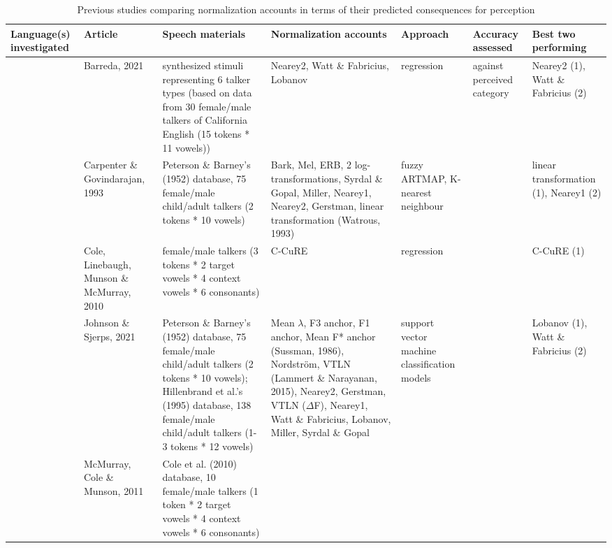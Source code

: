 \documentclass[utf8]{frontiersSCNS}
\begin{document}
\begin{landscape}\begin{table}

\caption{\label{tab:norm-evaluation-percep}Previous studies comparing normalization accounts in terms of their predicted consequences for perception}
\centering
\fontsize{7}{9}\selectfont
\begin{tabular}[t]{>{\raggedright\arraybackslash}p{2cm}>{\raggedright\arraybackslash}p{2cm}>{\raggedright\arraybackslash}p{5.5cm}>{\raggedright\arraybackslash}p{5.5cm}>{\raggedright\arraybackslash}p{2cm}>{\raggedright\arraybackslash}p{2cm}>{\raggedright\arraybackslash}p{1.5cm}}
\toprule
Language(s) investigated & Article & Speech materials & Normalization accounts & Approach & Accuracy assessed & Best two performing\\
\midrule
 & Barreda, 2021 & synthesized stimuli representing 6 talker types (based on data from 30 female/male talkers of California English (15 tokens * 11 vowels)) & Nearey2, Watt \& Fabricius, Lobanov & regression & against perceived category & Nearey2 (1), Watt \& Fabricius (2)\\
\cmidrule{2-7}
 & Carpenter \& Govindarajan, 1993 & Peterson \& Barney's (1952) database, 75 female/male child/adult talkers (2 tokens * 10 vowels) & Bark, Mel, ERB, 2 log-transformations, Syrdal \& Gopal, Miller, Nearey1, Nearey2, Gerstman, linear transformation (Watrous, 1993) & fuzzy ARTMAP, K-nearest neighbour & & linear transformation (1), Nearey1 (2)\\
\cmidrule{2-5}
\cmidrule{7-7}
 & Cole, Linebaugh, Munson \& McMurray, 2010 & 10 female/male talkers (3 tokens * 2 target vowels * 4 context vowels * 6 consonants) & C-CuRE & regression &  & C-CuRE (1)\\
\cmidrule{2-5}
\cmidrule{7-7}
 & Johnson \& Sjerps, 2021 & Peterson \& Barney's (1952) database, 75 female/male child/adult talkers (2 tokens * 10 vowels); Hillenbrand et al.'s (1995) database, 138 female/male child/adult talkers (1-3 tokens * 12 vowels) & Mean $\lambda$, F3 anchor, F1 anchor, Mean F* anchor (Sussman, 1986), Nordström, VTLN (Lammert \& Narayanan, 2015), Nearey2, Gerstman, VTLN ($\Delta$F), Nearey1, Watt \& Fabricius, Lobanov, Miller, Syrdal \& Gopal & support vector machine classification models &  & Lobanov (1), Watt \& Fabricius (2)\\
\cmidrule{2-5}
\cmidrule{7-7}
 & McMurray, Cole \& Munson, 2011 & Cole et al. (2010) database, 10 female/male talkers (1 token * 2 target vowels * 4 context vowels * 6 consonants) &  &  & \multirow{-12}{2cm}{\raggedright\arraybackslash against intended category} & \\

\end{tabular}
\end{table}
\end{landscape}
\end{document}
